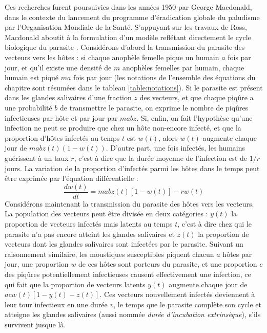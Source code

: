 Ces recherches furent poursuivies dans les années 1950 par George Macdonald, dans le contexte du lancement du programme d'éradication globale du paludisme par l'Organisation Mondiale de la Santé.
S'appuyant sur les travaux de Ross, Macdonald aboutit à la formulation d'un modèle reflétant directement le cycle biologique du parasite \cite{macdonald1952analysis,koella1991use}.
Considérons d'abord la transmission du parasite des vecteurs vers les hôtes : si chaque anophèle femelle pique un humain $a$ fois par jour, et qu'il existe une densité de $m$ anophèles femelles par humain, chaque humain est piqué $ma$ fois par jour (les notations de l'ensemble des équations du chapitre sont résumées dans le tableau \ref{table:notations}).
Si le parasite est présent dans les glandes salivaires d'une fraction $z$ des vecteurs, et que chaque piqûre a une probabilité $b$ de transmettre le parasite, on exprime le nombre de piqûres infectieuses par hôte et par jour par $mabz$.
Si, enfin, on fait l'hypothèse qu'une infection ne peut se produire que chez un hôte non-encore infecté, et que la proportion d'hôtes infectés au temps $t$ est $w(t)$, alors $w(t)$ augmente chaque jour de $mabz(t)(1-w(t))$.
D'autre part, une fois infectés, les humains guérissent à un taux $r$, c'est à dire que la durée moyenne de l'infection est de $1/r$ jours. 
La variation de la proportion d'infectés parmi les hôtes dans le temps peut être exprimée par l'équation différentielle :
\begin{equation}
\label{eq:eqRM1}
\frac{dw(t)}{dt} = mabz(t)[1-w(t)] - rw(t)
\end{equation}
Considérons maintenant la transmission du parasite des hôtes vers les vecteurs.
La population des vecteurs peut être divisée en deux catégories : $y(t)$ la proportion de vecteurs infectés mais latents au temps $t$, c'est à dire chez qui le parasite n'a pas encore atteint les glandes salivaires et $z(t)$ la proportion de vecteurs dont les glandes salivaires sont infectées par le parasite.
Suivant un raisonnement similaire, les moustiques susceptibles piquent chacun $a$ hôtes par jour, une proportion $w$ de ces hôtes sont porteurs du parasite, et une proportion $c$ des piqûres potentiellement infectieuses causent effectivement une infection, ce qui fait que la proportion de vecteurs latents $y(t)$ augmente chaque jour de $acw(t)[1-y(t)-z(t)]$.
Ces vecteurs nouvellement infectés deviennent à leur tour infectieux en une durée $v$, le temps que le parasite complète son cycle et atteigne les glandes salivaires (aussi nommée \textit{durée d'incubation extrinsèque}), s'ils survivent jusque là.
